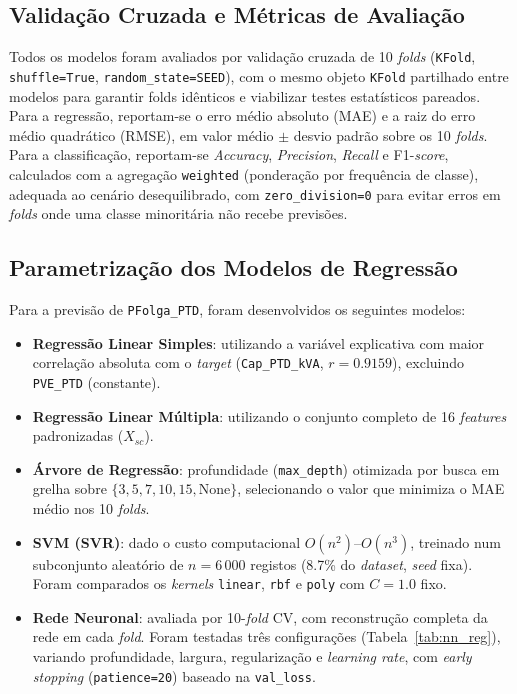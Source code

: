 \documentclass[conference]{IEEEtran}
\begin{document}
\subsection{Validação Cruzada e Métricas de Avaliação}

Todos os modelos foram avaliados por validação cruzada de 10 \textit{folds} (\texttt{KFold}, \texttt{shuffle=True}, \texttt{random\_state=SEED}), com o mesmo objeto \texttt{KFold} partilhado entre modelos para garantir folds idênticos e viabilizar testes estatísticos pareados. Para a regressão, reportam-se o erro médio absoluto (MAE) e a raiz do erro médio quadrático (RMSE), em valor médio $\pm$ desvio padrão sobre os 10 \textit{folds}. Para a classificação, reportam-se \textit{Accuracy}, \textit{Precision}, \textit{Recall} e F1-\textit{score}, calculados com a agregação \texttt{weighted} (ponderação por frequência de classe), adequada ao cenário desequilibrado, com \texttt{zero\_division=0} para evitar erros em \textit{folds} onde uma classe minoritária não recebe previsões.

\subsection{Parametrização dos Modelos de Regressão}

Para a previsão de \texttt{PFolga\_PTD}, foram desenvolvidos os seguintes modelos:

\begin{itemize}
    \item \textbf{Regressão Linear Simples}: utilizando a variável explicativa com maior correlação absoluta com o \textit{target} (\texttt{Cap\_PTD\_kVA}, $r=0.9159$), excluindo \texttt{PVE\_PTD} (constante).
    \item \textbf{Regressão Linear Múltipla}: utilizando o conjunto completo de 16 \textit{features} padronizadas ($X_{sc}$).
    \item \textbf{Árvore de Regressão}: profundidade (\texttt{max\_depth}) otimizada por busca em grelha sobre $\{3, 5, 7, 10, 15, \text{None}\}$, selecionando o valor que minimiza o MAE médio nos 10 \textit{folds}.
    \item \textbf{SVM (SVR)}: dado o custo computacional $O(n^2)$--$O(n^3)$, treinado num subconjunto aleatório de $n=6\,000$ registos (8.7\% do \textit{dataset}, \textit{seed} fixa). Foram comparados os \textit{kernels} \texttt{linear}, \texttt{rbf} e \texttt{poly} com $C=1.0$ fixo.
    \item \textbf{Rede Neuronal}: avaliada por 10-\textit{fold} CV, com reconstrução completa da rede em cada \textit{fold}. Foram testadas três configurações (Tabela~\ref{tab:nn_reg}), variando profundidade, largura, regularização e \textit{learning rate}, com \textit{early stopping} (\texttt{patience=20}) baseado na \texttt{val\_loss}.
\end{itemize}
\end{document}
